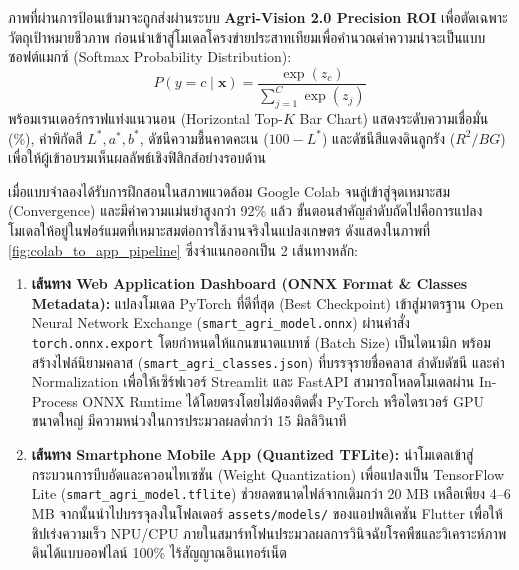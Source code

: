 ภาพที่ผ่านการป้อนเข้ามาจะถูกส่งผ่านระบบ \textbf{Agri-Vision 2.0 Precision ROI} เพื่อตัดเฉพาะวัตถุเป้าหมายชีวภาพ ก่อนนำเข้าสู่โมเดลโครงข่ายประสาทเทียมเพื่อคำนวณค่าความน่าจะเป็นแบบซอฟต์แมกซ์ (Softmax Probability Distribution):
\begin{equation}
    P(y = c \mid \mathbf{x}) = \frac{\exp(z_c)}{\sum_{j=1}^C \exp(z_j)}
\end{equation}
พร้อมเรนเดอร์กราฟแท่งแนวนอน (Horizontal Top-$K$ Bar Chart) แสดงระดับความเชื่อมั่น (\%), ค่าพิกัดสี $L^*, a^*, b^*$, ดัชนีความชื้นคาดคะเน ($100 - L^*$) และดัชนีสีแดงดินลูกรัง ($R^2 / BG$) เพื่อให้ผู้เข้าอบรมเห็นผลลัพธ์เชิงฟิสิกส์อย่างรอบด้าน

\label{sec:model_export_deployment}


เมื่อแบบจำลองได้รับการฝึกสอนในสภาพแวดล้อม Google Colab จนลู่เข้าสู่จุดเหมาะสม (Convergence) และมีค่าความแม่นยำสูงกว่า 92\% แล้ว ขั้นตอนสำคัญลำดับถัดไปคือการแปลงโมเดลให้อยู่ในฟอร์แมตที่เหมาะสมต่อการใช้งานจริงในแปลงเกษตร ดังแสดงในภาพที่ \ref{fig:colab_to_app_pipeline} ซึ่งจำแนกออกเป็น 2 เส้นทางหลัก:

\begin{enumerate}
    \item \textbf{เส้นทาง Web Application Dashboard (ONNX Format \& Classes Metadata):}
    แปลงโมเดล PyTorch ที่ดีที่สุด (Best Checkpoint) เข้าสู่มาตรฐาน Open Neural Network Exchange (\texttt{smart\_agri\_model.onnx}) ผ่านคำสั่ง \texttt{torch.onnx.export} โดยกำหนดให้แกนขนาดแบทช์ (Batch Size) เป็นไดนามิก พร้อมสร้างไฟล์นิยามคลาส (\texttt{smart\_agri\_classes.json}) ที่บรรจุรายชื่อคลาส ลำดับดัชนี และค่า Normalization เพื่อให้เซิร์ฟเวอร์ Streamlit และ FastAPI สามารถโหลดโมเดลผ่าน In-Process ONNX Runtime ได้โดยตรงโดยไม่ต้องติดตั้ง PyTorch หรือไดรเวอร์ GPU ขนาดใหญ่ มีความหน่วงในการประมวลผลต่ำกว่า 15 มิลลิวินาที

    
    \item \textbf{เส้นทาง Smartphone Mobile App (Quantized TFLite):}
    นำโมเดลเข้าสู่กระบวนการบีบอัดและควอนไทเซชัน (Weight Quantization) เพื่อแปลงเป็น TensorFlow Lite (\texttt{smart\_agri\_model.tflite}) ช่วยลดขนาดไฟล์จากเดิมกว่า 20 MB เหลือเพียง 4--6 MB จากนั้นนำไปบรรจุลงในโฟลเดอร์ \texttt{assets/models/} ของแอปพลิเคชัน Flutter เพื่อให้ชิปเร่งความเร็ว NPU/CPU ภายในสมาร์ทโฟนประมวลผลการวินิจฉัยโรคพืชและวิเคราะห์ภาพดินได้แบบออฟไลน์ 100\% ไร้สัญญาณอินเทอร์เน็ต
\end{enumerate}

\label{sec:iphone_android_deploy}

